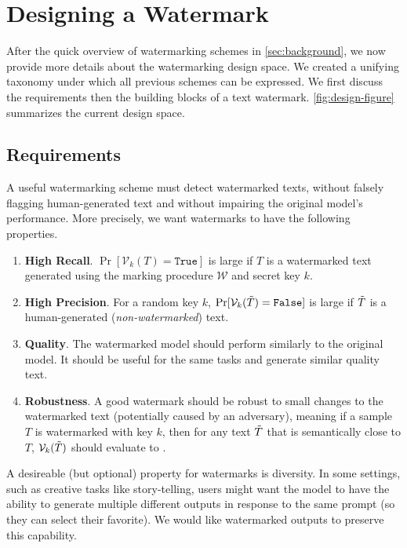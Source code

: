 \section{Designing a Watermark}
\label{sec:taxonomy}

After the quick overview of watermarking schemes in \cref{sec:background}, we now provide more details 
about the watermarking design space. We created a unifying taxonomy under which all previous schemes 
can be expressed. We first discuss the requirements then the building blocks of a text watermark. 
%
%
\cref{fig:design-figure} summarizes the current design space.

\subsection{Requirements}

A useful watermarking scheme must detect watermarked texts, without falsely flagging human-generated text and without impairing the original model's performance.
%
More precisely, we want watermarks to have the following properties.
\begin{enumerate}[leftmargin=\itemlm,itemsep=2pt]
    \item \textbf{High Recall}. $\Pr[\mathcal{V}_k(T) = \texttt{True}]$ is large if $T$ is a watermarked text generated using the marking procedure $\mathcal{W}$ and secret key $k$.
    \item \textbf{High Precision}. For a random key $k$, $\Pr[\mathcal{V}_k(\Tilde{T}) = \texttt{False}]$ is large if $\Tilde{T}$ is a human-generated (\emph{non-watermarked}) text.
    \item \textbf{Quality}. The watermarked model should perform similarly to the original model. 
    It should be useful for the same tasks and generate similar quality text.
    \item \textbf{Robustness}. A good watermark should be robust to small changes to the watermarked text (potentially caused by an adversary), 
    meaning if a sample $T$ is watermarked with key $k$, then for any text $\Tilde{T}$ that is semantically close to $T$, $\mathcal{V}_k(\Tilde{T})$ should evaluate to .
\end{enumerate}

\noindent
A desireable (but optional) property for watermarks is diversity. 
In some settings, such as creative tasks like story-telling, users might want the model to have the ability to generate 
multiple different outputs in response to the same prompt (so they can select their favorite).
We would like watermarked outputs to preserve this capability.


